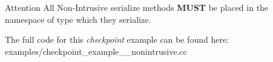 \begin{DoxyAttention}{Attention}
All Non-\/\+Intrusive serialize methods {\bfseries M\+U\+ST} be placed in the namespace of type which they serialize.
\end{DoxyAttention}
The full code for this {\itshape checkpoint} example can be found here\+: {\ttfamily examples/checkpoint\+\_\+example\+\_\+\_\+nonintrusive.\+cc}


\begin{DoxyCodeInclude}
\end{DoxyCodeInclude}
